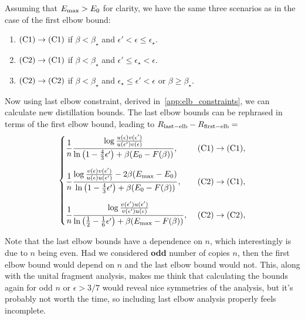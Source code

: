 \documentclass[pra,
aps,
twocolumn,
superscriptaddress,
groupedaddress,
nofootinbib,
reprint
]{revtex4-1}
\begin{document}
Assuming that $E_{\rm{max}} > E_0$ for clarity, we have the same three scenarios as in the case of the first elbow bound:
\begin{enumerate}
	\item $\rm{(C1)} \rightarrow \rm{(C1)}$ if $\beta < \beta_{\star}$ and $\epsilon' < \epsilon  \leq \epsilon_{\star}$.
	\item $\rm{(C2)} \rightarrow \rm{(C1)}$ if $\beta < \beta_{\star}$ and $\epsilon' \leq \epsilon_{\star} < \epsilon$.
	\item $\rm{(C2)} \rightarrow \rm{(C2)}$ if $\beta < \beta_{\star}$ and $\epsilon_{\star} \leq \epsilon' < \epsilon$ or $\beta \geq \beta_{\star}$.
\end{enumerate}
Now using last elbow constraint, derived in~\cref{app:elb_constraints}, we can calculate new distillation bounds.
The last elbow bounds can be rephrased in terms of the first elbow bound, leading to $R_{\rm{last-elb}} - R_{\rm{first-elb}} = $
\begin{equation}\label{eq:last_elb_coords}
	\begin{cases}
		\dfrac{1}{n} \dfrac{\log{\frac{u(\epsilon)v(\epsilon')}{u(\epsilon')v(\epsilon)}}}{\ln{\big( 1-\frac{4}{3}\epsilon' \big)} + \beta (E_0 - F(\beta))},\ &\rm{(C1)} \rightarrow \rm{(C1)}, \vspace{10pt}\\
		\dfrac{1}{n} \dfrac{\log{\frac{v(\epsilon)v(\epsilon')}{u(\epsilon)u(\epsilon')}} - 2\beta(E_{\rm{max}} - E_0)}{\ln{\big( 1-\frac{4}{3}\epsilon' \big)} + \beta (E_0 - F(\beta))},\ &\rm{(C2)} \rightarrow \rm{(C1)}, \vspace{10pt}\\
		\dfrac{1}{n} \dfrac{\log{\frac{v(\epsilon')u(\epsilon')}{v(\epsilon')u(\epsilon)}}}{\ln{\big( \frac{1}{2}-\frac{1}{6}\epsilon' \big)} + \beta (E_{\rm{max}} - F(\beta))},\ &\rm{(C2)} \rightarrow \rm{(C2)}, 
	\end{cases}
\end{equation}

Note that the last elbow bounds have a dependence on $n$, which interestingly is due to $n$ being even.
Had we considered \textbf{odd} number of copies $n$, then the first elbow bound would depend on $n$ and the last elbow bound would not.
This, along with the unital fragment analysis, makes me think that calculating the bounds again for odd $n$ or $\epsilon > 3/7$ would reveal nice symmetries of the analysis, but it's probably not worth the time, so including last elbow analysis properly feels incomplete.
\end{document}
